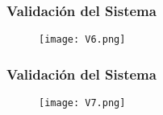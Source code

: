 
\begin{frame}
    \frametitle{Validación del Sistema}
    \begin{figure}[H]
        \centering
        \texttt{[image: V6.png]} %
        \label{fig:V6}
    \end{figure}
\end{frame}


\begin{frame}
    \frametitle{Validación del Sistema}
    \begin{figure}[H]
        \centering
        \texttt{[image: V7.png]} %
        \label{fig:V7}
    \end{figure}
\end{frame}
